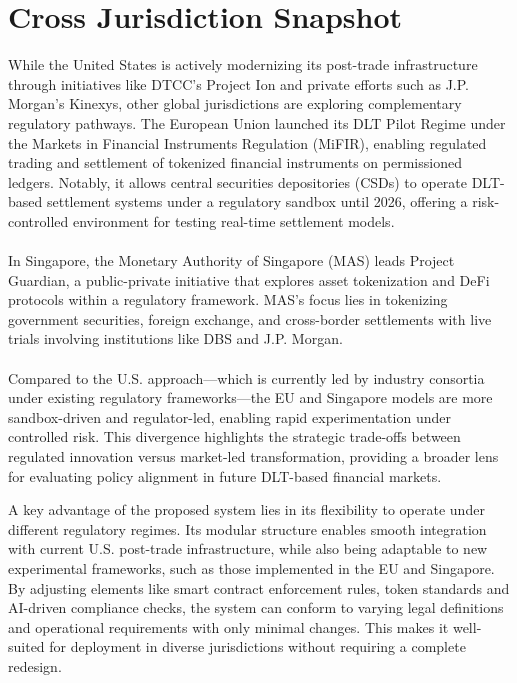 \documentclass[conference]{IEEEtran}
\begin{document}
\section{Cross Jurisdiction Snapshot}
While the United States is actively modernizing its post-trade infrastructure through initiatives like DTCC’s Project Ion and private efforts such as J.P. Morgan’s Kinexys, other global jurisdictions are exploring complementary regulatory pathways. The European Union launched its DLT Pilot Regime under the Markets in Financial Instruments Regulation (MiFIR), enabling regulated trading and settlement of tokenized financial instruments on permissioned ledgers. Notably, it allows central securities depositories (CSDs) to operate DLT-based settlement systems under a regulatory sandbox until 2026, offering a risk-controlled environment for testing real-time settlement models\cite{b12}. \\\\In Singapore, the Monetary Authority of Singapore (MAS) leads Project Guardian, a public-private initiative that explores asset tokenization and DeFi protocols within a regulatory framework. MAS's focus lies in tokenizing government securities, foreign exchange, and cross-border settlements with live trials involving institutions like DBS and J.P. Morgan\cite{b13}.\\\\ Compared to the U.S. approach—which is currently led by industry consortia under existing regulatory frameworks—the EU and Singapore models are more sandbox-driven and regulator-led, enabling rapid experimentation under controlled risk. This divergence highlights the strategic trade-offs between regulated innovation versus market-led transformation, providing a broader lens for evaluating policy alignment in future DLT-based financial markets.

A key advantage of the proposed system lies in its flexibility to operate under different regulatory regimes. Its modular structure enables smooth integration with current U.S. post-trade infrastructure, while also being adaptable to new experimental frameworks, such as those implemented in the EU and Singapore. By adjusting elements like smart contract enforcement rules, token standards and AI-driven compliance checks, the system can conform to varying legal definitions and operational requirements with only minimal changes. This makes it well-suited for deployment in diverse jurisdictions without requiring a complete redesign.
\end{document}
